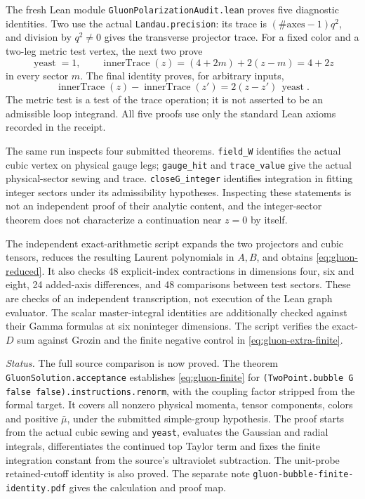 \documentclass[11pt]{article}
\newcommand{\code}[1]{{\small\nolinkurl{#1}}}
\begin{document}
The fresh Lean module \code{GluonPolarizationAudit.lean} proves five
diagnostic identities. Two use the actual \code{Landau.precision}:
its trace is $(\#\mathrm{axes}-1)q^2$, and division by $q^2\ne0$ gives
the transverse projector trace. For a fixed color and a two-leg metric
test vertex, the next two prove
\[
 \operatorname{yeast}=1,\qquad
 \operatorname{innerTrace}(z)=(4+2m)+2(z-m)=4+2z
\]
in every sector $m$. The final identity proves, for arbitrary inputs,
\[
 \operatorname{innerTrace}(z)-\operatorname{innerTrace}(z')
 =2(z-z')\,\operatorname{yeast}.
\]
The metric test is a test of the trace operation; it is not asserted to
be an admissible loop integrand. All five proofs use only the standard
Lean axioms recorded in the receipt.

The same run inspects four submitted theorems. \code{field_W} identifies
the actual cubic vertex on physical gauge legs; \code{gauge_hit} and
\code{trace_value} give the actual physical-sector sewing and trace.
\code{closeG_integer} identifies integration in fitting integer sectors
under its admissibility hypotheses. Inspecting these statements is not
an independent proof of their analytic content, and the integer-sector
theorem does not characterize a continuation near $z=0$ by itself.

The independent exact-arithmetic script expands the two projectors and
cubic tensors, reduces the resulting Laurent polynomials in $A,B$, and
obtains \eqref{eq:gluon-reduced}. It also checks 48 explicit-index
contractions in dimensions four, six and eight, 24 added-axis differences,
and 48 comparisons between test sectors. These are checks of an
independent transcription, not execution of the Lean graph evaluator.
The scalar master-integral identities are additionally checked against
their Gamma formulas at six noninteger dimensions. The script verifies
the exact-$D$ sum against Grozin and the finite negative control in
\eqref{eq:gluon-extra-finite}.

\emph{Status.} The full source comparison is now proved. The theorem
\code{GluonSolution.acceptance} establishes \eqref{eq:gluon-finite} for
\code{(TwoPoint.bubble G false false).instructions.renorm}, with the coupling
factor stripped from the formal target. It covers all nonzero physical
momenta, tensor components, colors and positive $\bar\mu$, under the submitted
simple-group hypothesis. The proof starts from the actual cubic sewing and
\code{yeast}, evaluates the Gaussian and radial integrals, differentiates
the continued top Taylor term and fixes the finite integration constant
from the source's ultraviolet subtraction. The unit-probe retained-cutoff
identity is also proved. The separate note
\code{gluon-bubble-finite-identity.pdf} gives the calculation and proof map.
\end{document}
